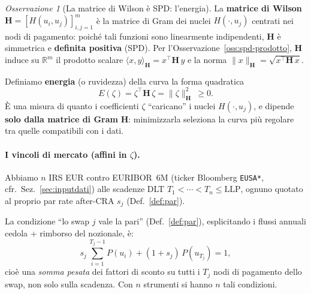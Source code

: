\documentclass[11pt,a4paper]{article}
\theoremstyle{plain}
\theoremstyle{definition}
\theoremstyle{remark}
\newtheorem*{osservazione}{Osservazione}
\newcommand{\LLP}{\ensuremath{\mathrm{LLP}}}
\newcommand{\Hmat}{\mathbf{H}}
\newcommand{\transp}{^{\!\top}}
\begin{document}
\begin{osservazione}[La matrice di Wilson \`e SPD: l'energia]
\label{oss:energia}
La \textbf{matrice di Wilson} $\Hmat = [H(u_i,u_j)]_{i,j=1}^{m}$ \`e la matrice di Gram
dei nuclei $H(\cdot,u_j)$ centrati nei nodi di pagamento: poich\'e tali funzioni sono
linearmente indipendenti, $\Hmat$ \`e simmetrica e \textbf{definita positiva} (SPD).
Per l'Osservazione~\ref{oss:spd-prodotto}, $\Hmat$ induce su $\mathbb{R}^m$ il prodotto
scalare $\langle x,y\rangle_{\Hmat} = x\transp\Hmat\,y$ e la norma $\|x\|_{\Hmat} = \sqrt{x\transp\Hmat\,x}$.

Definiamo \textbf{energia} (o ruvidezza) della curva la forma quadratica
\[
  E(\zeta) = \zeta\transp \Hmat\, \zeta = \|\zeta\|_{\Hmat}^2 \ \ge 0 .
\]
\`E una misura di quanto i coefficienti $\zeta$ ``caricano'' i nuclei $H(\cdot,u_j)$,
e dipende \textbf{solo dalla matrice di Gram} $\Hmat$: minimizzarla seleziona la curva
pi\`u regolare tra quelle compatibili con i dati.
\end{osservazione}

\paragraph{I vincoli di mercato (affini in $\zeta$).}
Abbiamo $n$ IRS EUR contro EURIBOR~6M (ticker Bloomberg \texttt{EUSA*},
cfr.~Sez.~\ref{sec:inputdati}) alle scadenze DLT $T_1<\cdots<T_n\le\LLP$, ognuno quotato al
proprio par rate after-CRA $s_j$ (Def.~\ref{def:par}).

La condizione ``lo swap $j$ vale la pari'' (Def.~\ref{def:par}), esplicitando i flussi
annuali cedola + rimborso del nozionale, \`e:
\[
  s_j\,\sum_{i=1}^{T_j-1} P(u_i) + (1+s_j)\,P(u_{T_j}) = 1,
\]
cio\`e una \emph{somma pesata} dei fattori di sconto su tutti i $T_j$ nodi di pagamento dello
swap, non solo sulla scadenza. Con $n$ strumenti si hanno $n$ tali condizioni.
\end{document}
